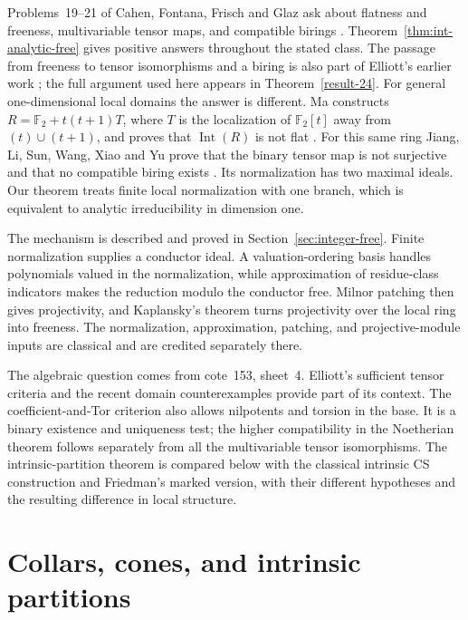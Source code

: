 \documentclass[11pt,a4paper]{article}
\theoremstyle{definition}
\begin{document}
Problems~19--21 of Cahen, Fontana, Frisch and Glaz ask about flatness
and freeness, multivariable tensor maps, and compatible birings
\cite[authors' version pp.~9--10]{CFFG2014OpenProblems}.
Theorem~\ref{thm:int-analytic-free} gives positive answers throughout
the stated class. The passage from freeness to tensor isomorphisms
and a biring is also part of Elliott's earlier work
\cite[Theorem~4 and Corollary~5, p.~54]{Elliott2010}; the full argument
used here appears in Theorem~\ref{result-24}.
For general one-dimensional local domains the answer is different.
Ma constructs
$R=\mathbb F_2+t(t+1)T$, where $T$ is the localization of
$\mathbb F_2[t]$ away from $(t)\cup(t+1)$, and proves that
$\operatorname{Int}(R)$ is not flat
\cite[Lemma~3.1 and Proposition~4.1, pp.~2--5]{Ma2026}.
For this same ring Jiang, Li, Sun, Wang, Xiao and Yu prove that
the binary tensor map is not surjective and that no compatible
biring exists \cite[Theorem~3.4, pp.~7--8]{Rethlas2026}.
Its normalization has two maximal ideals. Our theorem treats
finite local normalization with one branch, which is equivalent
to analytic irreducibility in dimension one.

The mechanism is described and proved in
Section~\ref{sec:integer-free}. Finite normalization supplies a
conductor ideal. A valuation-ordering basis handles polynomials
valued in the normalization, while approximation of residue-class
indicators makes the reduction modulo the conductor free.
Milnor patching then gives projectivity, and Kaplansky's theorem
turns projectivity over the local ring into freeness. The
normalization, approximation, patching, and projective-module
inputs are classical and are credited separately there.

The algebraic question comes from cote~153, sheet~4.
Elliott's sufficient tensor criteria \cite[Theorem~12, pp.~56--57]{Elliott2010}
and the recent domain counterexamples \cite[\S3.4]{Rethlas2026}
\cite[\S\S2--3]{Ma2026} provide part of its context. The coefficient-and-Tor criterion
also allows nilpotents and torsion in the base. It is a binary existence
and uniqueness test; the higher compatibility in the Noetherian theorem
follows separately from all the multivariable tensor isomorphisms.
The intrinsic-partition theorem is compared below with the classical
intrinsic CS construction and Friedman's marked version, with their
different hypotheses and the resulting difference in local structure.

\begingroup
\small
\setlength{\parskip}{0pt}
\tableofcontents
\endgroup
\clearpage
\part{Collars, cones, and intrinsic partitions}
\end{document}
